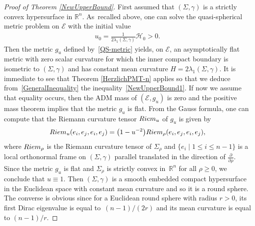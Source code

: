 \documentclass[10pt,a4paper]{article}
\numberwithin{equation}{section}
\theoremstyle{definition}
\begin{document}
\begin{proof}[Proof of Theorem \ref{NewUpperBound}]
First assumed that $(\Sigma,\gamma)$ is a strictly convex hypersurface in $\mathbb{R}^n$. As~recalled above, one can solve the quasi-spherical metric problem on $\mathcal{E}$ with the initial value
\begin{gather*}%
u_0=\frac{1}{2\lambda_1(\Sigma,\gamma)}\mathcal{H}_0>0.
\end{gather*}
Then the metric $g_u$ defined by~\eqref{QS-metric} yields, on $\mathcal{E}$, an asymptotically flat metric with zero scalar curvature for which the inner compact boundary is isometric to $(\Sigma,\gamma)$ and has constant mean curvature $H=2\lambda_1(\Sigma,\gamma)$. It is immediate to see that Theorem \ref{HerzlichPMT-n} applies so that we deduce from~\eqref{GeneralInequality} the inequality~\eqref{NewUpperBound1}. If now we assume that equality occurs, then the ADM mass of $(\mathcal{E},g_u)$ is zero and the positive mass theorem implies that the metric $g_u$ is flat. From the Gauss formula, one can compute that the Riemann curvature tensor ${\rm Riem}_u$ of $g_u$ is given by
\begin{gather*}%
{\rm Riem}_u(e_i,e_j,e_i,e_j)=\big(1-u^{-2}\big){\rm Riem}_\rho(e_i,e_j,e_i,e_j),
\end{gather*}
where ${\rm Riem}_\rho$ is the Riemann curvature tensor of $\Sigma_\rho$ and $\{e_i\mid 1\leq i\leq n-1\}$ is a local orthonormal frame on $(\Sigma,\gamma)$ parallel translated in the direction of $\frac{\partial}{\partial \rho}$. Since the metric $g_u$ is flat and $\Sigma_\rho$ is strictly convex in~$\mathbb{R}^n$ for all $\rho\geq0$, we conclude that $u\equiv 1$. Then $(\Sigma,\gamma)$ is a smooth embedded compact hypersurface in the Euclidean space with constant mean curvature and so it is a round sphere. The converse is obvious since for a Euclidean round sphere with radius $r>0$, its first Dirac eigenvalue is equal to~$(n-1)/(2r)$ and its mean curvature is equal to $(n-1)/r$.


\end{proof}
\end{document}
